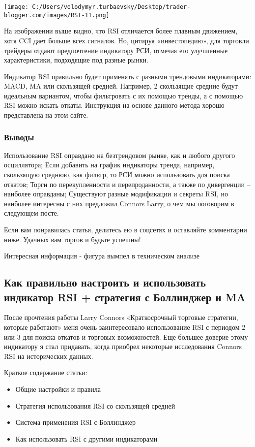 \documentclass[a5paper]{article}
\begin{document}
\texttt{[image: C:/Users/volodymyr.turbaevsky/Desktop/trader-blogger.com/images/RSI-11.png]}

На изображении выше видно, что RSI отличается более плавным движением, хотя CCI дает больше всех сигналов. Но, цитируя «инвестопедию», для торговли трейдеры отдают предпочтение индикатору РСИ, отмечая его улучшенные характеристики, подходящие под разные рынки.

Индикатор RSI правильно будет применять с разными трендовыми
индикаторами: MACD, MA или скользящей средней. Например, 2 скользящие
средние будут идеальным вариантом, чтобы фильтровать с их помощью
тренды, а с помощью RSI можно искать откаты. Инструкция на основе
данного метода хорошо представлена на этом сайте.

\subsubsection{Выводы}

    Использование RSI оправдано на безтрендовом рынке, как и любого другого осциллятора;
    Если добавить на график индикаторы тренда, например, скользящую среднюю, как фильтр, то РСИ можно использовать для поиска откатов;
    Торги по перекупленности и перепроданности, а также по дивергенции – наиболее оправданы;
    Существуют разные модификации и секреты RSI, но наиболее интересны с них предложил Connors Larry, о чем мы поговорим в следующем посте.

Если вам понравилась статья, делитесь ею в соцсетях и оставляйте комментарии ниже. Удачных вам торгов и будьте успешны!


Интересная информация - фигура вымпел в техническом анализе

\subsection{Как правильно настроить и использовать индикатор RSI +
  стратегия с Боллинджер и MA}

После прочтения работы Larry Connors «Краткосрочный торговые стратегии, которые работают» меня очень заинтересовало использование RSI с периодом 2 или 3 для поиска откатов и торговых возможностей. Еще большее доверие этому индикатору я стал придавать, когда приобрел некоторые исследования Connors RSI на исторических данных.

Краткое содержание статьи:
\begin{itemize}
\item         Общие настройки и правила
\item         Стратегия использования RSI со скользящей средней
\item         Система применения RSI с Боллинджер
\item         Как использовать RSI с другими индикаторами
\end{itemize}
\end{document}
